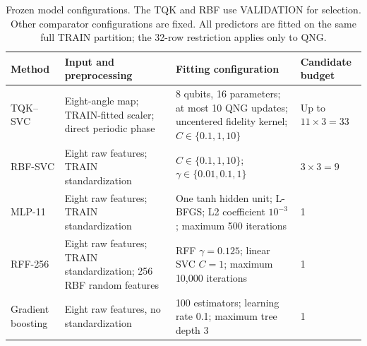 \begin{table}[t]
\caption{Frozen model configurations. The TQK and RBF use VALIDATION for selection. Other comparator configurations are fixed. All predictors are fitted on the same full TRAIN partition; the 32-row restriction applies only to QNG.}
\label{tab:comparator-budget}
\centering
\footnotesize
\setlength{\tabcolsep}{4pt}
\begin{tabular}{@{}p{}p{}p{}p{}@{}}
\toprule
Method & Input and preprocessing & Fitting configuration & Candidate budget \\
\midrule
TQK--SVC & Eight-angle map; TRAIN-fitted scaler; direct periodic phase & 8 qubits, 16 parameters; at most 10 QNG updates; uncentered fidelity kernel; $C\in\{0.1,1,10\}$ & Up to $11\times3=33$ \\
RBF-SVC & Eight raw features; TRAIN standardization & $C\in\{0.1,1,10\}$; $\gamma\in\{0.01,0.1,1\}$ & $3\times3=9$ \\
MLP-11 & Eight raw features; TRAIN standardization & One tanh hidden unit; L-BFGS; L2 coefficient $10^{-3}$; maximum 500 iterations & 1 \\
RFF-256 & Eight raw features; TRAIN standardization; 256 RBF random features & RFF $\gamma=0.125$; linear SVC $C=1$; maximum 10,000 iterations & 1 \\
Gradient boosting & Eight raw features, no standardization & 100 estimators; learning rate 0.1; maximum tree depth 3 & 1 \\
\bottomrule
\end{tabular}
\end{table}
